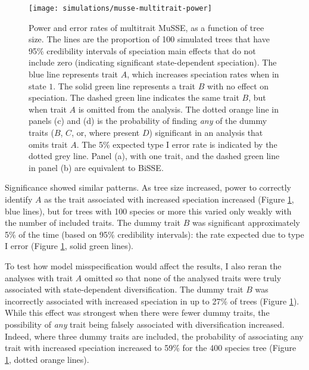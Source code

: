 \documentclass[12pt]{article}
\begin{document}
\begin{figure}[p]
  \centering
  \texttt{[image: simulations/musse-multitrait-power]}
  \caption[Power and error rates of multitrait MuSSE]{%
    Power and error rates of multitrait MuSSE, as a function of tree
    size.
    The lines are the proportion of 100 simulated trees that have 95\%
    credibility intervals of speciation main effects that do not
    include zero (indicating significant state-dependent speciation).
    The blue line represents trait $A$, which increases speciation
    rates when in state $1$.
    The solid green line represents a trait $B$ with no effect on
    speciation.
    The dashed green line indicates the same trait $B$, but when trait
    $A$ is omitted from the analysis.
    The dotted orange line in panels (c) and (d) is the probability of
    finding \emph{any} of the dummy traits ($B$, $C$, or, where
    present $D$) significant in an analysis that omits trait $A$.
    The 5\% expected type I error rate is indicated by the dotted grey
    line.
    Panel (a), with one trait, and the dashed green line in panel (b)
    are equivalent to BiSSE.}
  \label{fig:musse-power}
\end{figure}


Significance showed similar patterns.  As tree size increased, power
to correctly identify $A$ as the trait associated with increased
speciation increased (Figure \ref{fig:musse-power}, blue lines), but
for trees with 100 species or more this varied only weakly with the
number of included traits.
%
The dummy trait $B$ was significant approximately 5\% of the time
(based on 95\% credibility intervals): the rate expected due to type I
error (Figure \ref{fig:musse-power}, solid green lines).

To test how model misspecification would affect the results, I also
reran the analyses with trait $A$ omitted so that none of the analysed
traits were truly associated with state-dependent diversification.
%
The dummy trait $B$ was incorrectly associated with increased
speciation in up to 27\% of trees (Figure \ref{fig:musse-power}).
%
While this effect was strongest when there were fewer dummy traits,
the possibility of \emph{any} trait being falsely associated with
diversification increased.  Indeed, where three dummy traits are
included, the probability of associating any trait with increased
speciation increased to 59\% for the 400 species tree
(Figure \ref{fig:musse-power}, dotted orange lines).
\end{document}
